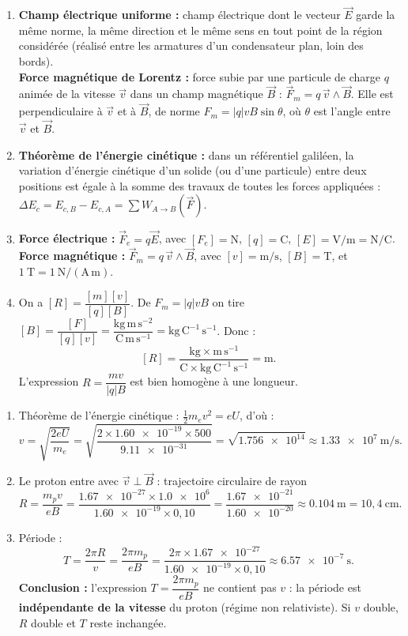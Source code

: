 \documentclass[11pt]{article}
\begin{document}
\begin{corrige}
\begin{enumerate}
\item \textbf{Champ électrique uniforme :} champ électrique dont le vecteur $\vec{E}$ garde la même norme, la même direction et le même sens en tout point de la région considérée (réalisé entre les armatures d'un condensateur plan, loin des bords).\\
\textbf{Force magnétique de Lorentz :} force subie par une particule de charge $q$ animée de la vitesse $\vec{v}$ dans un champ magnétique $\vec{B}$ : $\vec{F}_m = q\,\vec{v}\wedge\vec{B}$. Elle est perpendiculaire à $\vec{v}$ et à $\vec{B}$, de norme $F_m = |q|vB\sin\theta$, où $\theta$ est l'angle entre $\vec{v}$ et $\vec{B}$.
\item \textbf{Théorème de l'énergie cinétique :} dans un référentiel galiléen, la variation d'énergie cinétique d'un solide (ou d'une particule) entre deux positions est égale à la somme des travaux de toutes les forces appliquées : $\Delta E_c = E_{c,B} - E_{c,A} = \sum W_{A\to B}(\vec{F})$.
\item \textbf{Force électrique :} $\vec{F}_e = q\vec{E}$, avec $[F_e] = \mathrm{N}$, $[q] = \mathrm{C}$, $[E] = \mathrm{V/m} = \mathrm{N/C}$.\\
\textbf{Force magnétique :} $\vec{F}_m = q\,\vec{v}\wedge\vec{B}$, avec $[v] = \mathrm{m/s}$, $[B] = \mathrm{T}$, et $1~\mathrm{T} = 1~\mathrm{N/(A\,m)}$.
\item On a $[R] = \dfrac{[m][v]}{[q][B]}$. De $F_m = |q|vB$ on tire $[B] = \dfrac{[F]}{[q][v]} = \dfrac{\mathrm{kg\,m\,s^{-2}}}{\mathrm{C\,m\,s^{-1}}} = \mathrm{kg\,C^{-1}\,s^{-1}}$. Donc :
\[
[R] = \frac{\mathrm{kg}\times\mathrm{m\,s^{-1}}}{\mathrm{C}\times\mathrm{kg\,C^{-1}\,s^{-1}}} = \mathrm{m}.
\]
L'expression $R = \dfrac{mv}{|q|B}$ est bien homogène à une longueur.
\end{enumerate}
\end{corrige}

\begin{corrige}
\begin{enumerate}
\item Théorème de l'énergie cinétique : $\frac{1}{2}m_e v^2 = eU$, d'où :
\[
v = \sqrt{\frac{2eU}{m_e}} = \sqrt{\frac{2\times\num{1,60e-19}\times 500}{\num{9,11e-31}}} = \sqrt{\num{1,756e14}} \approx \num{1,33e7}~\mathrm{m/s}.
\]
\item Le proton entre avec $\vec{v}\perp\vec{B}$ : trajectoire circulaire de rayon
\[
R = \frac{m_p v}{eB} = \frac{\num{1,67e-27}\times\num{1,0e6}}{\num{1,60e-19}\times 0,10} = \frac{\num{1,67e-21}}{\num{1,60e-20}} \approx \num{0,104}~\mathrm{m} = 10,4~\mathrm{cm}.
\]
\item Période :
\[
T = \frac{2\pi R}{v} = \frac{2\pi m_p}{eB} = \frac{2\pi\times\num{1,67e-27}}{\num{1,60e-19}\times 0,10} \approx \num{6,57e-7}~\mathrm{s}.
\]
\textbf{Conclusion :} l'expression $T = \dfrac{2\pi m_p}{eB}$ ne contient pas $v$ : la période est \textbf{indépendante de la vitesse} du proton (régime non relativiste). Si $v$ double, $R$ double et $T$ reste inchangée.
\end{enumerate}
\end{corrige}
\end{document}
